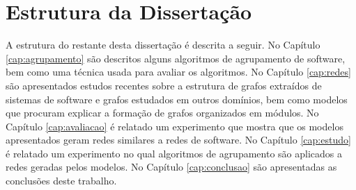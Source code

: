 % 
% 

\section{Estrutura da Dissertação}

A estrutura do restante desta dissertação é descrita a seguir. 
%
No Capítulo \ref{cap:agrupamento} são descritos alguns algoritmos de agrupamento de software, bem como uma técnica usada para avaliar os algoritmos.
%
No Capítulo \ref{cap:redes} são apresentados estudos recentes sobre a estrutura de grafos extraídos de sistemas de software e grafos estudados em outros domínios, bem como modelos que procuram explicar a formação de grafos organizados em módulos.
%
No Capítulo \ref{cap:avaliacao} é relatado um experimento que mostra que os modelos apresentados geram redes similares a redes de software.
%
No Capítulo \ref{cap:estudo} é relatado um experimento no qual algoritmos de agrupamento são aplicados a redes geradas pelos modelos.
%
No Capítulo \ref{cap:conclusao} são apresentadas as conclusões deste trabalho. 


